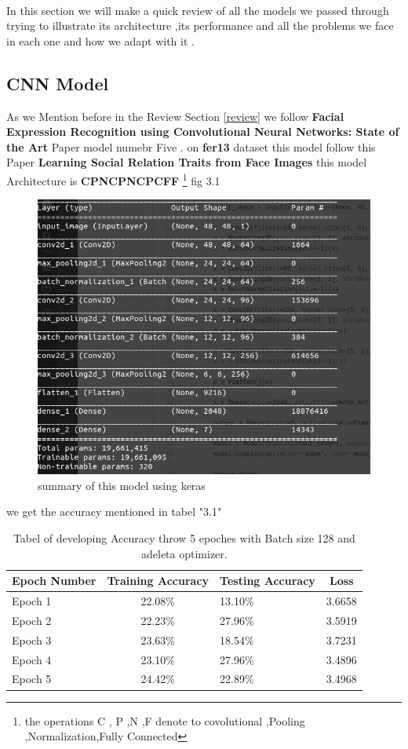 \paragraph{}
In this section we will make a quick review of all the models we passed through trying to illustrate its architecture ,its performance and all the problems we face in each one and how we adapt with it .
\subsection{CNN Model}
As we Mention before in the Review Section \ref{review} we follow \textbf{Facial Expression Recognition using Convolutional Neural Networks: State of the Art} Paper\cite{state_of_art} model numebr Five .
on \textbf{fer13} dataset this model follow this Paper \textbf{Learning Social Relation Traits from Face Images} this model Architecture is \textbf{CPNCPNCPCFF} \footnote{ the operations C , P ,N ,F denote to covolutional ,Pooling ,Normalization,Fully Connected } fig 3.1
\begin{figure}
	\centering
	\includegraphics[width=.8\textwidth]{model14.jpg}
	\caption{summary of this model using keras}
\end{figure} 
we get the accuracy mentioned in tabel "3.1"
\begin{table}[h!]
	\begin{center}
		\caption{Tabel of developing Accuracy throw  5 epoches with Batch size 128 and adeleta optimizer.}
		\begin{tabular}{l|c|l|c}
			\textbf{Epoch Number} & \textbf{Training Accuracy} & \textbf{Testing Accuracy} &\textbf{Loss}\\ 
			\hline 
			Epoch 1 & 22.08\% & 13.10\% & 3.6658 \\
			Epoch 2 & 22.23\% & 27.96\% & 3.5919 \\
			Epoch 3 & 23.63\% & 18.54\% & 3.7231 \\
			Epoch 4 & 23.10\% & 27.96\% & 3.4896 \\
			Epoch 5 & 24.42\% & 22.89\% &  3.4968 \\									
			\end{tabular}
	\end{center}
\end{table}
